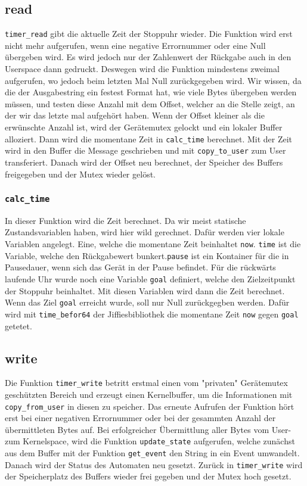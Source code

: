 \documentclass[
   draft=false
  ,paper=a4
  ,twoside=false
  ,fontsize=11pt
  ,headsepline
  ,BCOR10mm
  ,DIV11
  ,parskip=full+
]{scrartcl} %
\begin{document}
\subsection{read}
\texttt{timer\_read} gibt die aktuelle Zeit der Stoppuhr wieder. 
Die Funktion wird erst nicht mehr aufgerufen, wenn eine negative Errornummer 
oder eine Null übergeben wird. Es wird jedoch nur der Zahlenwert der Rückgabe 
auch in den Userspace dann gedruckt. Deswegen wird die Funktion mindestens 
zweimal aufgerufen, wo jedoch beim letzten Mal Null zurückgegeben wird. 
Wir wissen, da die der Ausgabestring ein festest Format hat, wie viele Bytes 
übergeben werden müssen, und testen diese Anzahl mit dem Offset, welcher an 
die Stelle zeigt, an der wir das letzte mal aufgehört haben. 
Wenn der Offset kleiner als die erwünschte Anzahl ist, wird der Gerätemutex 
gelockt und ein lokaler Buffer alloziert. Dann wird die momentane Zeit in
\texttt{calc\_time} berechnet. Mit der Zeit wird in den Buffer die Message 
geschrieben und mit \texttt{copy\_to\_user} zum User transferiert. 
Danach wird der Offset neu berechnet, der Speicher des Buffers freigegeben und
der Mutex wieder gelöst.


\subsubsection{\texttt{calc\_time}}
In dieser Funktion wird die Zeit berechnet. Da wir meist statische 
Zustandsvariablen haben, wird hier wild gerechnet. Dafür werden vier lokale 
Variablen angelegt. Eine, welche die momentane Zeit beinhaltet \texttt{now}.
\texttt{time} ist die Variable, welche den Rückgabewert bunkert.\texttt{pause} 
ist ein Kontainer für die in Pausedauer, wenn sich das Gerät in der Pause 
befindet. Für die rückwärts laufende Uhr wurde noch eine Variable
\texttt{goal} definiert, welche den Zielzeitpunkt der Stoppuhr beinhaltet. 
Mit diesen Variablen wird dann die Zeit berechnet. Wenn das Ziel \texttt{goal}
erreicht wurde, soll nur Null zurückgegben werden. Dafür wird mit 
\texttt{time\_befor64} der Jiffiesbibliothek die momentane Zeit \texttt{now} 
gegen \texttt{goal} getetet.


\subsection{write}
Die Funktion \texttt{timer\_write} betritt erstmal einen vom "{}privaten"{} 
Gerätemutex geschützten Bereich und erzeugt einen Kernelbuffer, um die 
Informationen mit \texttt{copy\_from\_user} in diesen zu speicher.
Das erneute Aufrufen der Funktion hört erst bei einer negativen Errornummer 
oder bei der gesammten Anzahl der übermittleten Bytes auf. 
Bei erfolgreicher Übermittlung aller 
Bytes vom User- zum Kernelspace, wird die Funktion \texttt{update\_state} 
aufgerufen, welche zunächst aus dem Buffer mit der Funktion
\texttt{get\_event} den String in ein Event umwandelt. Danach wird der Status 
des Automaten neu gesetzt. Zurück in \texttt{timer\_write} wird der 
Speicherplatz des Buffers wieder frei gegeben und der Mutex hoch gesetzt. 
\end{document}
